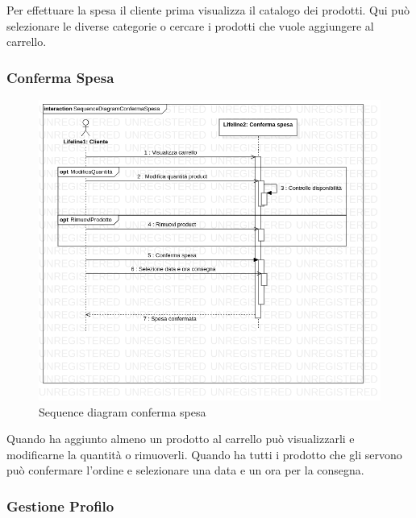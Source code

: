 \documentclass[12pt, a4paper]{report}
\begin{document}
Per effettuare la spesa il cliente prima visualizza il catalogo dei prodotti.
Qui può selezionare le diverse categorie o cercare i prodotti che vuole
aggiungere al carrello.

\newpage

\subsubsection{Conferma Spesa}

\begin{figure}[h]
  \centering
  \includegraphics[width=\textwidth]{Use Case Model!Conferma spesa!InteractionConfermaSpesa!SequenceDiagramConfermaSpesa_13.png}
  \caption{Sequence diagram conferma spesa}
\end{figure}

Quando ha aggiunto almeno un prodotto al carrello può visualizzarli e
modificarne la quantità o rimuoverli. Quando ha tutti i prodotto che gli
servono può confermare l'ordine e selezionare una data e un ora per la
consegna.

\newpage

\subsubsection{Gestione Profilo}
\end{document}

